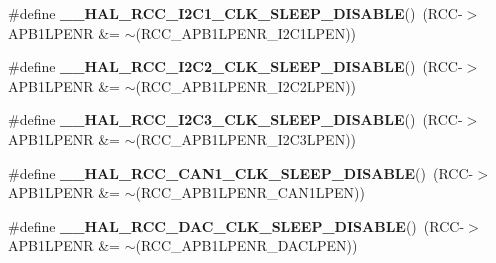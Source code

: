 \begin{DoxyCompactItemize}
\item 
\mbox{\label{group___r_c_c_ex___peripheral___clock___sleep___enable___disable_gac7dc1c5239cd70bee94eefa3d91cdd7a}} 
\#define {\bfseries \+\_\+\+\_\+\+H\+A\+L\+\_\+\+R\+C\+C\+\_\+\+I2\+C1\+\_\+\+C\+L\+K\+\_\+\+S\+L\+E\+E\+P\+\_\+\+D\+I\+S\+A\+B\+LE}()~(R\+CC-\/$>$A\+P\+B1\+L\+P\+E\+NR \&= $\sim$(R\+C\+C\+\_\+\+A\+P\+B1\+L\+P\+E\+N\+R\+\_\+\+I2\+C1\+L\+P\+EN))
\item 
\mbox{\label{group___r_c_c_ex___peripheral___clock___sleep___enable___disable_ga46fe2d4331320cfe49b751b5488fc0cd}} 
\#define {\bfseries \+\_\+\+\_\+\+H\+A\+L\+\_\+\+R\+C\+C\+\_\+\+I2\+C2\+\_\+\+C\+L\+K\+\_\+\+S\+L\+E\+E\+P\+\_\+\+D\+I\+S\+A\+B\+LE}()~(R\+CC-\/$>$A\+P\+B1\+L\+P\+E\+NR \&= $\sim$(R\+C\+C\+\_\+\+A\+P\+B1\+L\+P\+E\+N\+R\+\_\+\+I2\+C2\+L\+P\+EN))
\item 
\mbox{\label{group___r_c_c_ex___peripheral___clock___sleep___enable___disable_ga6bd3af59e8a11e3321a41bc29ba51f18}} 
\#define {\bfseries \+\_\+\+\_\+\+H\+A\+L\+\_\+\+R\+C\+C\+\_\+\+I2\+C3\+\_\+\+C\+L\+K\+\_\+\+S\+L\+E\+E\+P\+\_\+\+D\+I\+S\+A\+B\+LE}()~(R\+CC-\/$>$A\+P\+B1\+L\+P\+E\+NR \&= $\sim$(R\+C\+C\+\_\+\+A\+P\+B1\+L\+P\+E\+N\+R\+\_\+\+I2\+C3\+L\+P\+EN))
\item 
\mbox{\label{group___r_c_c_ex___peripheral___clock___sleep___enable___disable_gaa4222e958047e126f69e2ee362196a16}} 
\#define {\bfseries \+\_\+\+\_\+\+H\+A\+L\+\_\+\+R\+C\+C\+\_\+\+C\+A\+N1\+\_\+\+C\+L\+K\+\_\+\+S\+L\+E\+E\+P\+\_\+\+D\+I\+S\+A\+B\+LE}()~(R\+CC-\/$>$A\+P\+B1\+L\+P\+E\+NR \&= $\sim$(R\+C\+C\+\_\+\+A\+P\+B1\+L\+P\+E\+N\+R\+\_\+\+C\+A\+N1\+L\+P\+EN))
\item 
\mbox{\label{group___r_c_c_ex___peripheral___clock___sleep___enable___disable_gab24893ba4a827492272e611d2756d928}} 
\#define {\bfseries \+\_\+\+\_\+\+H\+A\+L\+\_\+\+R\+C\+C\+\_\+\+D\+A\+C\+\_\+\+C\+L\+K\+\_\+\+S\+L\+E\+E\+P\+\_\+\+D\+I\+S\+A\+B\+LE}()~(R\+CC-\/$>$A\+P\+B1\+L\+P\+E\+NR \&= $\sim$(R\+C\+C\+\_\+\+A\+P\+B1\+L\+P\+E\+N\+R\+\_\+\+D\+A\+C\+L\+P\+EN))

\end{DoxyCompactItemize}
